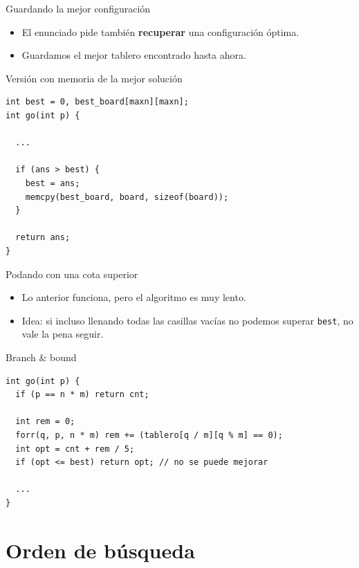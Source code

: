 \documentclass[aspectratio=169]{beamer}
\begin{document}
\begin{frame}[fragile]{Guardando la mejor configuración}
  \begin{itemize}
    \item El enunciado pide también \textbf{recuperar} una configuración óptima.
    \item Guardamos el mejor tablero encontrado hasta ahora.
  \end{itemize}
  \begin{block}{Versión con memoria de la mejor solución}
  \begin{lstlisting}[style=customc]
int best = 0, best_board[maxn][maxn];
int go(int p) {

  ...
  
  if (ans > best) {
    best = ans;
    memcpy(best_board, board, sizeof(board));
  }

  return ans;
}
  \end{lstlisting}
  \end{block}
\end{frame}

\begin{frame}[fragile]{Podando con una cota superior}
  \begin{itemize}
    \item Lo anterior funciona, pero el algoritmo es muy lento.
    \item Idea: si incluso llenando todas las casillas vacías no podemos superar \texttt{best}, no vale la pena seguir.
  \end{itemize}
  \begin{block}{Branch \& bound}
  \begin{lstlisting}[style=customc]
int go(int p) {
  if (p == n * m) return cnt;

  int rem = 0;
  forr(q, p, n * m) rem += (tablero[q / m][q % m] == 0);
  int opt = cnt + rem / 5;
  if (opt <= best) return opt; // no se puede mejorar

  ...
}
  \end{lstlisting}
  \end{block}
\end{frame}

\section{Orden de búsqueda}
\end{document}
